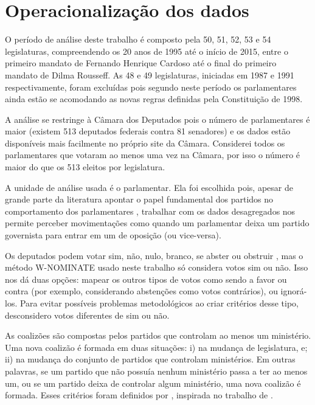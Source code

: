 \documentclass[a4paper,titlepage]{ppgi}\usepackage[]{graphicx}\usepackage[]{color}
\begin{document}
\section{Operacionalização dos dados}


O período de análise deste trabalho é composto pela 50\textordfeminine{},
51\textordfeminine{}, 52\textordfeminine{}, 53\textordfeminine{} e
54\textordfeminine{} legislaturas, compreendendo os 20 anos de 1995 até o
início de 2015, entre o primeiro mandato de Fernando Henrique Cardoso até o
final do primeiro mandato de Dilma Rousseff. As 48\textordfeminine{} e
49\textordfeminine{} legislaturas, iniciadas em 1987 e 1991 respectivamente,
foram excluídas pois segundo  neste período os
parlamentares ainda estão se acomodando as novas regras definidas pela
Constituição de 1998.


A análise se restringe à Câmara dos Deputados pois o número de parlamentares é
maior (existem 513 deputados federais contra 81 senadores) e os dados estão
disponíveis mais facilmente no próprio site da Câmara. Considerei todos os
parlamentares que votaram ao menos uma vez na Câmara, por isso o número é maior
do que os 513 eleitos por legislatura.

A unidade de análise usada é o parlamentar. Ela foi escolhida pois, apesar de
grande parte da literatura apontar o papel fundamental dos partidos no
comportamento dos parlamentares \cite{Figueiredo2001,Santos2003}, trabalhar com
os dados desagregados nos permite perceber movimentações como quando um
parlamentar deixa um partido governista para entrar em um de oposição (ou
vice-versa).


Os deputados podem votar sim, não, nulo, branco, se abster ou obstruir
\cite{Carneiro2013}, mas o método W-NOMINATE usado neste trabalho só considera
votos sim ou não. Isso nos dá duas opções: mapear os outros tipos de votos como
sendo a favor ou contra (por exemplo, considerando abstenções como votos
contrários), ou ignorá-los. Para evitar possíveis problemas metodológicos ao
criar critérios desse tipo, desconsidero votos diferentes de sim ou não.


As coalizões são compostas pelos partidos que controlam ao menos um ministério.
Uma nova coalizão é formada em duas situações: i) na mudança de legislatura, e;
ii) na mudança do conjunto de partidos que controlam ministérios. Em outras
palavras, se um partido que não possuía nenhum ministério passa a ter ao menos
um, ou se um partido deixa de controlar algum ministério, uma nova coalizão é
formada. Esses critérios foram definidos por ,
inspirada no trabalho de .
\end{document}
